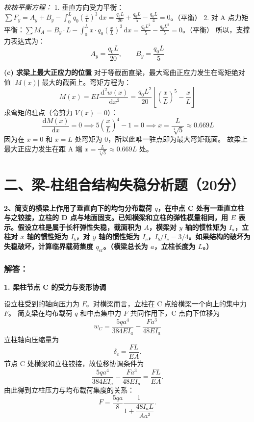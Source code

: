 \documentclass[11pt,a4paper]{ctexrep}
\newcommand{\diff}{\,\mathrm{d}}
\begin{document}
{\textit{校核平衡方程：}
1.  垂直方向受力平衡：$\sum F_y = A_y + B_y - \int_0^L q_0 \left(\frac{x}{L}\right)^3 \diff x = \frac{q_0 L}{20} + \frac{q_0 L}{5} - \frac{q_0 L}{4} = 0$。（平衡）
2.  对 A 点力矩平衡：$\sum M_A = B_y \cdot L - \int_0^L x \cdot q_0 \left(\frac{x}{L}\right)^3 \diff x = \frac{q_0 L^2}{5} - \frac{q_0 L^2}{5} = 0$。（平衡）
所以，支撑力表达式为：
\[
    A_y = \frac{q_0 L}{20}, \qquad B_y = \frac{q_0 L}{5}
\]

\textbf{(c) 求梁上最大正应力的位置}
对于等截面直梁，最大弯曲正应力发生在弯矩绝对值 $|M(x)|$ 最大的截面上。弯矩方程为：
\[
    M(x) = EI \frac{\diff^2 w(x)}{\diff x^2} = \frac{q_0 L^2}{20} \left[ \left(\frac{x}{L}\right)^5 - \frac{x}{L} \right]
\]
求弯矩的驻点（令剪力 $V(x) = 0$）：
\[
    \frac{\diff M(x)}{\diff x} = 0 \implies 5\left(\frac{x}{L}\right)^4 - 1 = 0 \implies x = \frac{L}{\sqrt[4]{5}} \approx 0.669 L
\]
因为在 $x=0$ 和 $x=L$ 处弯矩为 0，所以此唯一驻点即为最大弯矩截面。
故梁上最大正应力发生在距 A 端 $x = \frac{L}{\sqrt[4]{5}} \approx 0.669 L$ 处。




\section*{二、梁-柱组合结构失稳分析题（20分）}

\textbf{2、简支的横梁上作用了垂直向下的均匀分布载荷 $q$，在中点 C 处有一垂直立柱与之铰接，立柱的 D 点与地面固支。已知横梁和立柱的弹性模量相同，用 $E$ 表示。假设立柱是属于长杆弹性失稳，截面积为 $A$，横梁对 $y$ 轴的惯性矩为 $I_a$，立柱对 $x$ 轴的惯性矩为 $I_b$，对 $y$ 轴的惯性矩为 $I_c$，$I_b/I_c=3/4$。如果结构的破坏为失稳破坏，计算临界载荷集度 $q_{\text{cr}}$。（横梁总长为 $a$，立柱长度为 $L$。）}

\subsubsection*{解答：}

\textbf{1. 梁柱节点 C 的受力与变形协调}

设立柱受到的轴向压力为 $F$。对横梁而言，立柱在 C 点给横梁一个向上的集中力 $F$。
简支梁在均布载荷 $q$ 和中点集中力 $F$ 共同作用下，C 点向下位移为
\[
    w_C = \frac{5 q a^4}{384 E I_a} - \frac{F a^3}{48 E I_a}
\]
立柱轴向压缩量为
\[
    \delta_c=\frac{FL}{EA}.
\]
节点 C 处横梁和立柱铰接，故位移协调条件为
\[
    \frac{5 q a^4}{384 E I_a} - \frac{F a^3}{48 E I_a}
    =
    \frac{FL}{EA}.
\]
由此得到立柱压力与均布载荷集度的关系：
\[
    F
    =
    \frac{5qa}{8}
    \frac{1}{1+\dfrac{48I_aL}{Aa^3}}.
\]

}
\end{document}
